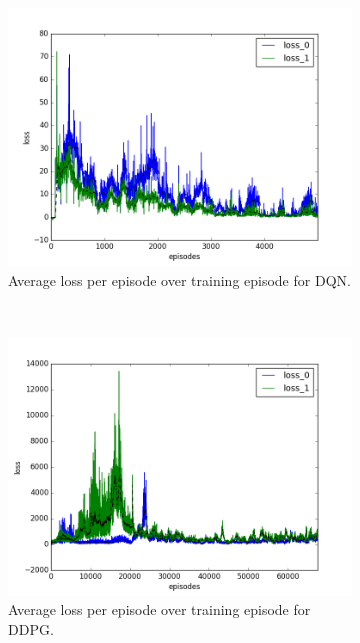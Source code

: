 \begin{figure}[h]
  \begin{subfigure}[h]{\figscale\linewidth}
    \includegraphics[trim=10 10 10 10,clip,width=\linewidth]
    {../results/dqn_1vs1/loss.png}
    \caption{Average loss per episode over training episode for DQN.}
    \label{fig:dqn-1vs1-loss}
  \end{subfigure}
  ~
  \begin{subfigure}[h]{\figscale\linewidth}
    \includegraphics[trim=10 10 10 10,clip,width=\linewidth]
    {../results/ddpg_1vs1/loss.png}
    \caption{Average loss per episode over training episode for DDPG.}
    \label{fig:ddpg-1vs1-loss}
  \end{subfigure}
  ~
  \begin{subfigure}[h]{\figscale\linewidth}

\end{subfigure}
\end{figure}

